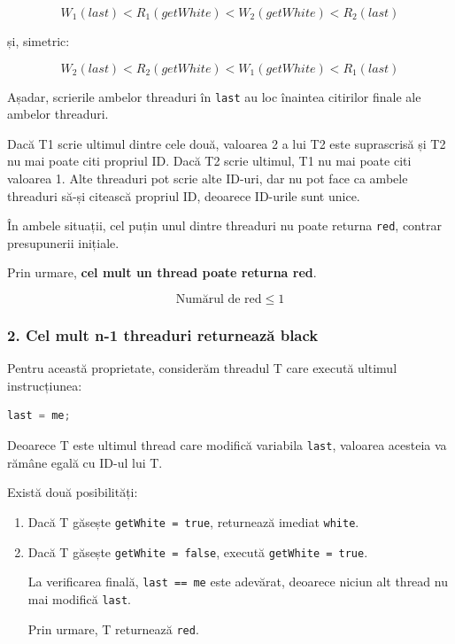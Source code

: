 \documentclass[12pt,a4paper]{article}
\begin{document}
\[
W_1(last) < R_1(getWhite) < W_2(getWhite) < R_2(last)
\]

și, simetric:

\[
W_2(last) < R_2(getWhite) < W_1(getWhite) < R_1(last)
\]

Așadar, scrierile ambelor threaduri în
\texttt{last} au loc înaintea citirilor finale
ale ambelor threaduri.

Dacă T1 scrie ultimul dintre cele două,
valoarea 2 a lui T2 este suprascrisă și T2
nu mai poate citi propriul ID. Dacă T2 scrie
ultimul, T1 nu mai poate citi valoarea 1.
Alte threaduri pot scrie alte ID-uri, dar nu
pot face ca ambele threaduri să-și citească
propriul ID, deoarece ID-urile sunt unice.

În ambele situații, cel puțin unul dintre
threaduri nu poate returna \texttt{red},
contrar presupunerii inițiale.

Prin urmare, \textbf{cel mult un thread poate
returna red}.

\[
\boxed{\text{Numărul de red} \leq 1}
\]

\subsubsection*{2. Cel mult n-1 threaduri
returnează black}

Pentru această proprietate, considerăm
threadul T care execută ultimul
instrucțiunea:

\begin{lstlisting}[language=Java]
last = me;
\end{lstlisting}

Deoarece T este ultimul thread care
modifică variabila \texttt{last},
valoarea acesteia va rămâne egală
cu ID-ul lui T.

Există două posibilități:

\begin{enumerate}
    \item Dacă T găsește
    \texttt{getWhite = true},
    returnează imediat \texttt{white}.

    \item Dacă T găsește
    \texttt{getWhite = false},
    execută \texttt{getWhite = true}.

    La verificarea finală,
    \texttt{last == me} este adevărat,
    deoarece niciun alt thread nu
    mai modifică \texttt{last}.

    Prin urmare, T returnează
    \texttt{red}.
\end{enumerate}
\end{document}
